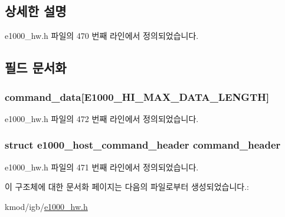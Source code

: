 \subsection{상세한 설명}


e1000\+\_\+hw.\+h 파일의 470 번째 라인에서 정의되었습니다.



\subsection{필드 문서화}
\subsubsection[{\texorpdfstring{command\+\_\+data}{command_data}}]{ command\+\_\+data\mbox{[}{\bf E1000\+\_\+\+H\+I\+\_\+\+M\+A\+X\+\_\+\+D\+A\+T\+A\+\_\+\+L\+E\+N\+G\+TH}\mbox{]}}\hypertarget{structe1000__host__command__info_a12026c993c83a0c740e9452e35cbb758}{}\label{structe1000__host__command__info_a12026c993c83a0c740e9452e35cbb758}


e1000\+\_\+hw.\+h 파일의 472 번째 라인에서 정의되었습니다.

\subsubsection[{\texorpdfstring{command\+\_\+header}{command_header}}]{\setlength{\rightskip}{0pt plus 5cm}struct {\bf e1000\+\_\+host\+\_\+command\+\_\+header} command\+\_\+header}\hypertarget{structe1000__host__command__info_ad77d3ca84282194fcfb87feed3168db1}{}\label{structe1000__host__command__info_ad77d3ca84282194fcfb87feed3168db1}


e1000\+\_\+hw.\+h 파일의 471 번째 라인에서 정의되었습니다.



이 구조체에 대한 문서화 페이지는 다음의 파일로부터 생성되었습니다.\+:\begin{DoxyCompactItemize}
\item 
kmod/igb/\hyperlink{kmod_2igb_2e1000__hw_8h}{e1000\+\_\+hw.\+h}\end{DoxyCompactItemize}

